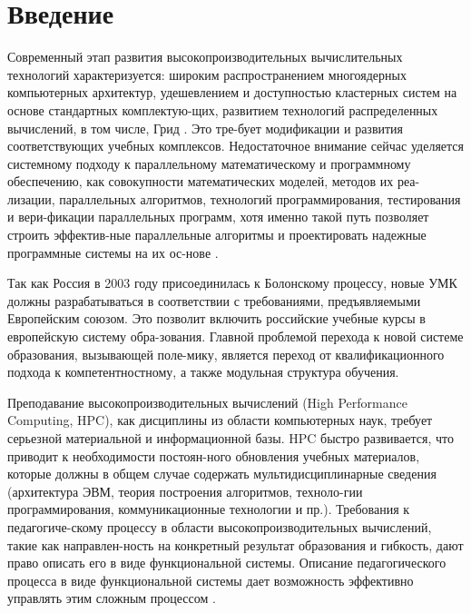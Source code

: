 \documentclass[11pt]{article}
\begin{document}
\section*{\textbf{Введение}}
Современный этап развития высокопроизводительных вычислительных технологий характеризуется: широким распространением многоядерных компьютерных архитектур, удешевлением и доступностью кластерных систем на основе стандартных комплектую-щих, развитием технологий распределенных вычислений, в том числе, Грид \cite{1}. Это тре-бует модификации и развития соответствующих учебных комплексов. Недостаточное внимание сейчас уделяется системному подходу к параллельному математическому и программному обеспечению, как совокупности математических моделей, методов их реа-лизации, параллельных алгоритмов, технологий программирования, тестирования и вери-фикации параллельных программ, хотя именно такой путь позволяет строить эффектив-ные параллельные алгоритмы и проектировать надежные программные системы на их ос-нове \cite{2}.\par
Так как Россия в 2003 году присоединилась к Болонскому процессу, новые УМК должны разрабатываться в соответствии с требованиями, предъявляемыми Европейским союзом. Это позволит включить российские учебные курсы в европейскую систему обра-зования. Главной проблемой перехода к новой системе образования, вызывающей поле-мику, является переход от квалификационного подхода к компетентностному,  а также модульная структура обучения.\par
Преподавание высокопроизводительных вычислений (High Performance Computing, HPC), как дисциплины из области компьютерных наук, требует серьезной материальной и информационной базы. HPC быстро развивается, что приводит к необходимости постоян-ного обновления учебных материалов, которые должны в общем случае содержать мультидис\-циплинарные сведения (архитектура ЭВМ, теория построения алгоритмов, техноло-гии программирования, коммуникационные технологии и пр.). Требования к педагогиче-скому процессу в области высокопроизводительных вычислений, такие как направлен-ность на конкретный результат образования и гибкость, дают право описать его в виде функциональной системы. Описание педагогического процесса в виде функциональной системы дает возможность эффективно управлять этим сложным процессом \cite{3}.
\newpage
\pagestyle{fancy}
\fancyhf{}
\lfoot{\thepage}
\cfoot{\today}
\rfoot{\currfilename}
\end{document}
